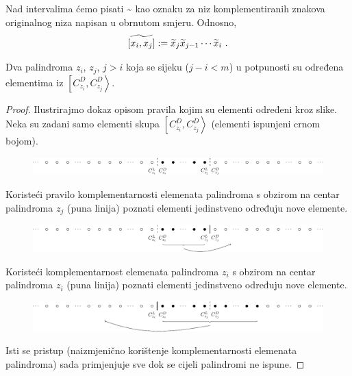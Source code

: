 Nad intervalima ćemo pisati \~{} kao oznaku
za niz komplementiranih znakova originalnog
niza napisan u obrnutom smjeru. Odnosno,
$$
\widetilde{[x_i,x_j]} := \widetilde{x}_j \widetilde{x}_{j-1} \cdots \widetilde{x}_i \ .
$$

\begin{lem}
	\label{lem:opresjekupalindroma}
	Dva palindroma $z_i$, $z_j$, $j>i$ koja se sijeku
	($j-i < m$)
	u potpunosti su određena elementima iz $\left[C_{z_i}^{D},C_{z_j}^{D}\right>$.
\end{lem}

\begin{proof}
	
	Ilustrirajmo dokaz opisom pravila kojim su elementi
	određeni kroz slike.
	Neka su zadani samo elementi skupa
	$\left[C_{z_i}^{D},C_{z_j}^{D}\right>$ (elementi ispunjeni crnom bojom).

	\begin{figure}[htb!]
	\centering%
	\includegraphics[scale = 0.8]{poglavlja/palindromi/slike/odredjenost-korak0-crop.pdf}
	\end{figure}

	Koristeći pravilo komplementarnosti elemenata palindroma
	s obzirom na centar palindroma $z_j$ (puna linija) 
	poznati elementi jedinstveno određuju nove elemente.

	\begin{figure}[htb!]
	\centering%
	\includegraphics[scale = 0.8]{poglavlja/palindromi/slike/odredjenost-korak1-crop.pdf}
	\end{figure}

	Koristeći komplementarnost elemenata palindroma $z_i$ s
	obzirom na centar palindroma $z_i$ (puna linija)
	poznati elementi jedinstveno određuju nove elemente.

	\begin{figure}[htb!]
	\centering%
	\includegraphics[scale = 0.8]{poglavlja/palindromi/slike/odredjenost-korak2-crop.pdf}
	\end{figure}

	Isti se pristup (naizmjenično korištenje komplementarnosti elemenata palindroma)
	sada primjenjuje sve dok se cijeli palindromi ne ispune.

\end{proof}


